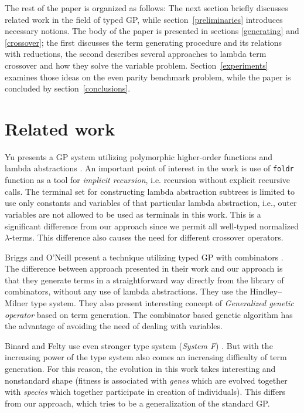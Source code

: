 \documentclass{sig-alternate}
\newcommand{\lterms}{$\lambda$-terms\xspace}
\newcommand{\red}[1]{{\color{red} #1}}
\begin{document}


The rest of the paper is organized as follows: The next section briefly discusses related work in the field of typed GP, while section~\ref{preliminaries} introduces necessary notions.
The body of the paper is presented in sections \ref{generating} and \ref{crossover}; the first discusses the term generating 
procedure and its relations
with reductions, the second describes several approaches to lambda term
crossover and how they solve the variable problem. Section~\ref{experiments} examines those ideas on the even parity benchmark problem, while the paper is concluded by section~\ref{conclusions}.

\vfill

\section{Related work}
\label{related}

Yu presents a GP system utilizing
polymorphic higher-order functions
and lambda abstractions  \cite{yu01}.
An important point of interest in the work is use of
\texttt{foldr} function as a tool for \textit{implicit recursion}, i.e. recursion without explicit recursive calls. The terminal set for constructing lambda abstraction subtrees  is limited to use only constants and variables of that particular lambda abstraction, i.e., outer variables are not allowed to be used as terminals in this work. This is a significant difference from our approach since we permit all well-typed normalized \lterms. This difference also causes the need for different crossover operators.  

Briggs and O’Neill present a technique 
utilizing typed GP with combinators \cite{kes}.
The difference between approach presented in their work
and our approach is that they generate terms in a straightforward way directly from the library of combinators, without any use of lambda abstractions. They use the Hindley–Milner type system. They also present interesting concept of \textit{Generalized genetic operator} based on term generation. The combinator based genetic algorithm has the advantage of avoiding the need of dealing with variables.

Binard and Felty use even stronger type system (\textit{System F}) \cite{binard2008genetic}. But with the increasing power of the type system also comes an increasing difficulty of term generation. For this reason, the evolution in this work takes interesting and nonstandard shape (fitness is associated with \textit{genes} which are evolved together with \textit{species} which together participate in creation of individuals). This differs from our approach, which tries to be a generalization of the standard GP\cite{koza92}.
\end{document}
